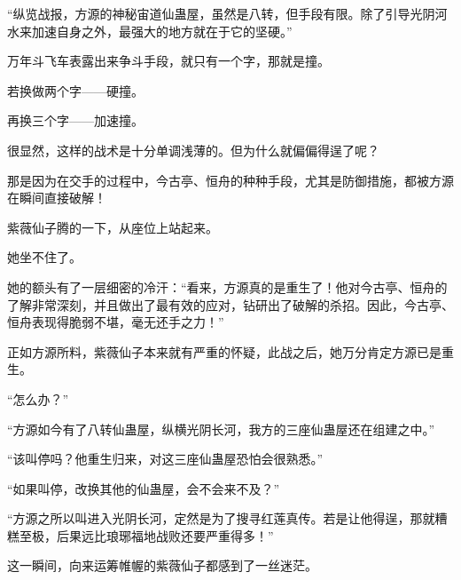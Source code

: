 \begin{this_body}
“纵览战报，方源的神秘宙道仙蛊屋，虽然是八转，但手段有限。除了引导光阴河水来加速自身之外，最强大的地方就在于它的坚硬。”

万年斗飞车表露出来争斗手段，就只有一个字，那就是撞。

若换做两个字——硬撞。

再换三个字——加速撞。

很显然，这样的战术是十分单调浅薄的。但为什么就偏偏得逞了呢？

那是因为在交手的过程中，今古亭、恒舟的种种手段，尤其是防御措施，都被方源在瞬间直接破解！

紫薇仙子腾的一下，从座位上站起来。

她坐不住了。

她的额头有了一层细密的冷汗：“看来，方源真的是重生了！他对今古亭、恒舟的了解非常深刻，并且做出了最有效的应对，钻研出了破解的杀招。因此，今古亭、恒舟表现得脆弱不堪，毫无还手之力！”

正如方源所料，紫薇仙子本来就有严重的怀疑，此战之后，她万分肯定方源已是重生。

“怎么办？”

“方源如今有了八转仙蛊屋，纵横光阴长河，我方的三座仙蛊屋还在组建之中。”

“该叫停吗？他重生归来，对这三座仙蛊屋恐怕会很熟悉。”

“如果叫停，改换其他的仙蛊屋，会不会来不及？”

“方源之所以叫进入光阴长河，定然是为了搜寻红莲真传。若是让他得逞，那就糟糕至极，后果远比琅琊福地战败还要严重得多！”

这一瞬间，向来运筹帷幄的紫薇仙子都感到了一丝迷茫。

\end{this_body}

